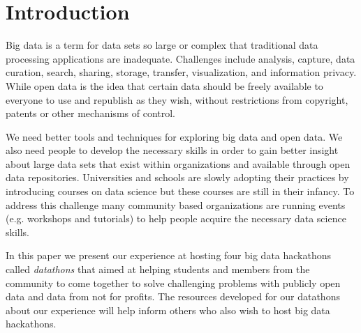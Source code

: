\section{Introduction}

Big data is a term for data sets so large or complex that traditional data processing applications are inadequate. Challenges include analysis, capture, data curation, search, sharing, storage, transfer, visualization, and information privacy. While open data is the idea that certain data should be freely available to everyone to use and republish as they wish, without restrictions from copyright, patents or other mechanisms of control. 

We need better tools and techniques for exploring big data and open data. We also need people to develop the necessary skills in order to gain better insight about large data sets that exist within organizations and available through open data repositories. Universities and schools are slowly adopting their practices by introducing courses on data science but these courses are still in their infancy. To address this challenge many community based organizations are running events (e.g. workshops and tutorials) to help people acquire the necessary data science skills.

In this paper we present our experience at hosting four big data hackathons called \emph{datathons} that aimed at helping students and members from the community to come together to solve challenging problems with publicly open data and data from not for profits. The resources developed for our datathons about our experience will help inform others who also wish to host big data hackathons.